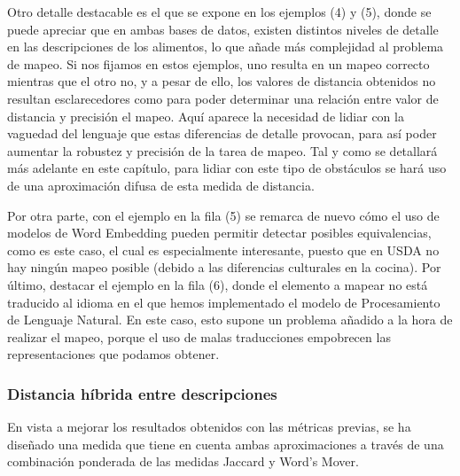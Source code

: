 Otro detalle destacable es el que se expone en los ejemplos (4) y (5), donde se puede apreciar que en ambas bases de datos, existen distintos niveles de detalle en las descripciones de los alimentos, lo que añade más complejidad al problema de mapeo. Si nos fijamos en estos ejemplos, uno resulta en un mapeo correcto mientras que el otro no, y a pesar de ello, los valores de distancia obtenidos no resultan esclarecedores como para poder determinar una relación entre valor de distancia y precisión el mapeo. Aquí aparece la necesidad de lidiar con la vaguedad del lenguaje que estas diferencias de detalle provocan, para así poder aumentar la robustez y precisión de la tarea de mapeo. Tal y como se detallará más adelante en este capítulo, para lidiar con este tipo de obstáculos se hará uso de una aproximación difusa de esta medida de distancia. 




Por otra parte, con el ejemplo en la fila (5) se remarca de nuevo cómo el uso de modelos de Word Embedding pueden permitir detectar posibles equivalencias, como es este caso, el cual es especialmente interesante, puesto que en USDA no hay ningún mapeo posible (debido a las diferencias culturales en la cocina). Por último, destacar el ejemplo en la fila (6), donde el elemento a mapear no está traducido al idioma en el que hemos implementado el modelo de Procesamiento de Lenguaje Natural. En este caso, esto supone un problema añadido a la hora de realizar el mapeo, porque el uso de malas traducciones empobrecen las representaciones que podamos obtener.



\subsubsection{Distancia híbrida entre descripciones}

En vista a mejorar los resultados obtenidos con las métricas previas, se ha diseñado una medida que tiene en cuenta ambas aproximaciones a través de una combinación ponderada de las medidas Jaccard y Word's Mover. 

